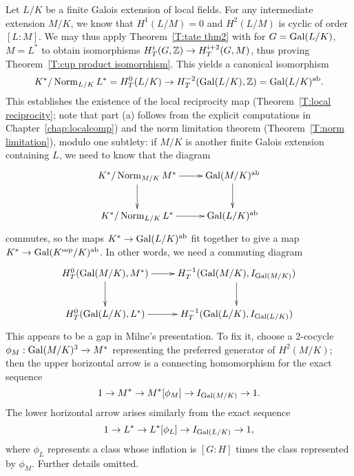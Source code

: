 
Let $L/K$ be a finite Galois extension of local fields.
For any intermediate extension $M/K$, we know that
$H^1(L/M) = 0$ and $H^2(L/M)$ is cyclic of order $[L:M]$. We may thus apply Theorem~\ref{T:tate thm2} with for $G = \operatorname{Gal}(L/K)$, $M = L^*$
to obtain isomorphisms $H^i_T(G, \mathbb{Z}) \to H^{i+2}_T(G,M)$,
thus proving Theorem~\ref{T:cup product isomorphism}. This yields
 a canonical isomorphism 
\[
K^*/\operatorname{Norm}_{L/K} L^* = H^0_T(L/K)
\to  H^{-2}_T(\operatorname{Gal}(L/K), \mathbb{Z}) = \operatorname{Gal}(L/K)^{\operatorname{ab}}.
\]
This establishes the existence of the local reciprocity map (Theorem~\ref{T:local reciprocity};
note that part (a) follows from the explicit computations in Chapter~\ref{chap:localcomp})
and the norm limitation theorem (Theorem~\ref{T:norm limitation}), modulo one subtlety:
if $M/K$ is another finite Galois extension containing $L$, we need to know that the diagram
\[
\xymatrix{
K^*/\Norm_{M/K} M^* \ar[r] \ar[d]  & \Gal(M/K)^{\ab} \ar[d] \\
K^*/\Norm_{L/K} L^* \ar[r] & \Gal(L/K)^{\ab}
}
\]
commutes,
so the maps $K^* \to \operatorname{Gal}(L/K)^{\operatorname{ab}}$ fit together to give a map $K^* \to \operatorname{Gal}(K^{\operatorname{sep}}/K)^{\operatorname{ab}}$. 
In other words, we need a commuting diagram
\[
\xymatrix{
H^0_T(\Gal(M/K), M^*)  \ar[r] \ar[d] & H^{-1}_T(\Gal(M/K), I_{\Gal(M/K)}) \ar[d] \\
 H^0_T(\Gal(L/K), L^*) \ar[r]& H^{-1}_T(\Gal(L/K), I_{\Gal(L/K)})
}
\]
This appears to be a gap in Milne's presentation.
To fix it, choose a 2-cocycle $\phi_M: \operatorname{Gal}(M/K)^3 \to M^*$ representing the preferred generator of $H^2(M/K)$; then the upper horizontal arrow is a connecting homomorphism
for the exact sequence
\[
1 \to M^* \to M^*[\phi_M] \to I_{\operatorname{Gal}(M/K)} \to 1.
\]
The lower horizontal arrow arises similarly from the exact sequence
\[
1 \to L^* \to L^*[\phi_L] \to I_{\operatorname{Gal}(L/K)} \to 1,
\]
where $\phi_L$ represents a class whose inflation is $[G:H]$ times the class represented by $\phi_M$.
Further details omitted.

